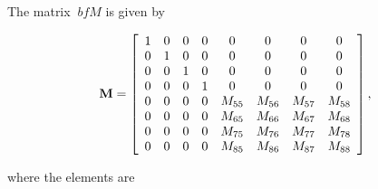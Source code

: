 \documentclass[sublist,a4paper,twoside,11pt]{article}
\begin{document}
The matrix \({\ bf M} \) is given by

\begin{equation} \label{leftMatrix}
    {\bf M} = \left[ \begin{array}{ccccccccc} 1 & 0 & 0 & 0 & 0 & 0 & 0 & 0 \\ 0 & 1 & 0 & 0 & 0 & 0 & 0 & 0 \\0 & 0 & 1 & 0 & 0 & 0 & 0 & 0 \\ 0 & 0 & 0 & 1 & 0 & 0 & 0 & 0 \\ 0 & 0 & 0 & 0 & M_{55} & M_{56} & M_{57} & M_{58} \\ 0 & 0 & 0 & 0 & M_{65} & M_{66} & M_{67} & M_{68} \\ 0 & 0 & 0 & 0 & M_{75} & M_{76} & M_{77} & M_{78} \\ 0 & 0 & 0 & 0 & M_{85} & M_{86} & M_{87} & M_{88} \end{array} \right],
\end{equation}

where the elements are
\end{document}
